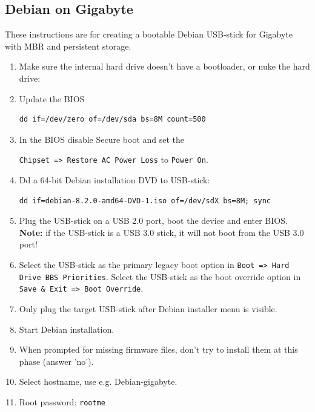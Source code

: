\documentclass[a4paper,11pt]{article}
\newcommand{\note}{\textbf{Note: }}
\newcommand{\cmd}[1]{\texttt{#1}}
\begin{document}
\subsection{Debian on Gigabyte}
These instructions are for creating a bootable Debian USB-stick for Gigabyte with MBR and persistent storage.

\begin{enumerate}
\item Make sure the internal hard drive doesn't have a bootloader, or nuke the hard drive: 

\item Update the BIOS


\begin{lstlisting}
dd if=/dev/zero of=/dev/sda bs=8M count=500
\end{lstlisting}

\item In the BIOS disable Secure boot and set the

\cmd{Chipset => Restore AC Power Loss} to \cmd{Power On}.

\item Dd a 64-bit Debian installation DVD to USB-stick:


\begin{lstlisting}
dd if=debian-8.2.0-amd64-DVD-1.iso of=/dev/sdX bs=8M; sync
\end{lstlisting}

\item Plug the USB-stick on a USB 2.0 port, boot the device and enter BIOS. \note if the USB-stick is a USB 3.0 stick, it will not boot from the USB 3.0 port!

\item Select the USB-stick as the primary legacy boot option in \cmd{Boot => Hard Drive BBS Priorities}. Select the USB-stick as the boot override option in \cmd{Save \& Exit => Boot Override}.

\item Only plug the target USB-stick after Debian installer menu is visible.

\item Start Debian installation.

\item When prompted for missing firmware files, don't try to install them at this phase (answer 'no').

\item Select hostname, use e.g. Debian-gigabyte.

\item Root password: \cmd{rootme}


\end{enumerate}
\end{document}

